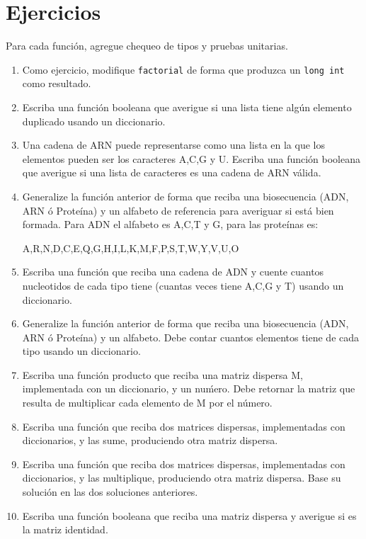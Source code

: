 \section{Ejercicios}


Para cada función, agregue chequeo de tipos y pruebas unitarias.


\begin{enumerate}
 
 \item Como ejercicio, modifique \texttt{factorial} de forma que produzca un \texttt{long int} como resultado.
 
 \item Escriba una función booleana que averigue si una lista tiene algún elemento duplicado usando un 
 diccionario.
 
 \item Una cadena de ARN puede representarse como una lista en la que los elementos pueden ser los
 caracteres A,C,G y U. Escriba una función booleana que averigue si una lista de caracteres es una cadena 
 de ARN válida. 
 
 \item Generalize la función anterior de forma que reciba una biosecuencia (ADN, ARN ó Proteína) y un 
 alfabeto de referencia para averiguar si está bien formada. Para ADN el alfabeto es A,C,T y G, para las
 proteínas es:
 
 A,R,N,D,C,E,Q,G,H,I,L,K,M,F,P,S,T,W,Y,V,U,O

 \item Escriba una función que reciba una cadena de ADN y cuente cuantos nucleotidos de cada tipo tiene (cuantas
 veces tiene A,C,G y T) usando un diccionario.
 
 \item Generalize la función anterior de forma que reciba una biosecuencia (ADN, ARN ó Proteína) y un alfabeto.
 Debe contar cuantos elementos tiene de cada tipo usando un diccionario.
 
 \item Escriba una función producto que reciba una matriz dispersa M, implementada con un diccionario, y un nuḿero. Debe
 retornar la matriz que resulta de multiplicar cada elemento de M por el número.
 
 \item Escriba una función que reciba dos matrices dispersas, implementadas con diccionarios, y las sume, produciendo
 otra matriz dispersa.
 
 \item Escriba una función que reciba dos matrices dispersas, implementadas con diccionarios, y las multiplique, produciendo
 otra matriz dispersa. Base su solución en las dos soluciones anteriores.
 
 \item Escriba una función booleana que reciba una matriz dispersa y averigue si es la matriz identidad.
\end{enumerate}


